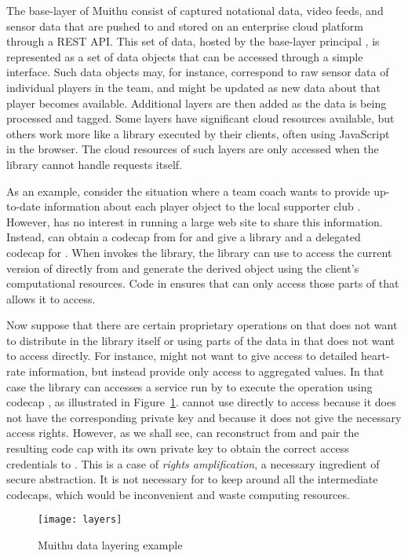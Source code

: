 \documentclass[10pt, conference, compsocconf]{IEEEtran}
\begin{document}
The base-layer of Muithu consist of captured notational data, video
feeds, and sensor data that are pushed to and stored on an enterprise
cloud platform through a REST API.  This set of data, hosted by the
base-layer principal , is represented as a set of data objects that
can be accessed through a simple interface.  Such data objects may, for
instance, correspond to raw sensor data of individual players in the team,
and might be updated as new data about that player becomes available.
Additional layers are then added as the data is being processed and
tagged.  Some layers have significant cloud resources available, but
others work more like a library executed by their clients, often using
JavaScript in the browser.  The cloud resources of such layers are
only accessed when the library cannot handle requests itself.

As an example, consider the situation where a team coach  wants to
provide up-to-date information about each player object  to the local
supporter club .  However,  has no interest in running a large
web site to share this information.  Instead,  can obtain a codecap
 from  for  and give  a library and a delegated codecap
 for .  When  invokes the library, the library can use 
to access the current version of  directly from  and generate
the derived object  using the client's computational resources. 
Code in  ensures that  can only access those parts of  that
 allows it to access.


Now suppose that there are certain proprietary operations on  that
 does not want to distribute in the library itself or using parts
of the data in  that  does not want  to access directly.
For instance,  might not want to give access to detailed heart-rate
information, but instead provide only access to aggregated values.
In that case the library can accesses a service run by  to execute
the operation using codecap , as illustrated in Figure~\ref{fig:muithu}.
   cannot use  directly
to access  because it does not have the corresponding private key
and because it does not give the necessary access rights.  However,
as we shall see,  can reconstruct  from  and pair the
resulting code cap with its own private key to obtain the correct access
credentials to .  This is a case of \emph{rights amplification},
a necessary ingredient of secure abstraction.  It is not necessary
for  to keep around all the intermediate codecaps, which would be
inconvenient and waste computing resources.

\begin{figure}
\texttt{[image: layers]}
\caption{Muithu data layering example}
\label{fig:muithu}
\end{figure}
\end{document}
